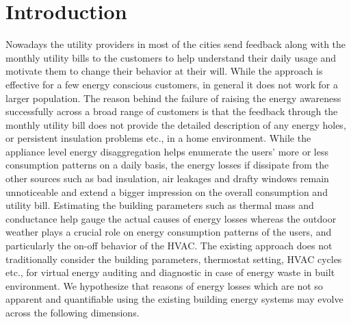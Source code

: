 \documentclass{sig-alternate}
\begin{document}
\section{Introduction}
Nowadays the utility providers in most of the cities send feedback along with the monthly utility bills to the customers to help understand their daily usage and motivate them to change their behavior at their will. While the approach is effective for a few energy conscious customers, in general it does not work for a larger population. The reason behind the failure of raising the energy awareness successfully across a broad range of customers is that the feedback through the monthly utility bill does not provide the detailed description of any energy holes, or persistent insulation problems etc., in a home environment. While the appliance level energy disaggregation helps enumerate the users' more or less consumption patterns on a daily basis, the energy losses if dissipate from the other sources such as bad insulation, air leakages and drafty windows remain unnoticeable and extend a bigger impression on the overall consumption and utility bill. Estimating the building parameters such as thermal mass and conductance help gauge the actual causes of energy losses whereas the outdoor weather plays a crucial role on energy consumption patterns of the users, and particularly the on-off behavior of the HVAC. The existing approach does not traditionally consider the building parameters, thermostat setting, HVAC cycles etc., for virtual energy auditing and diagnostic in case of energy waste in built environment. We hypothesize that reasons of energy losses which are not so apparent and quantifiable using the existing building energy systems may evolve across the following dimensions.
\end{document}
